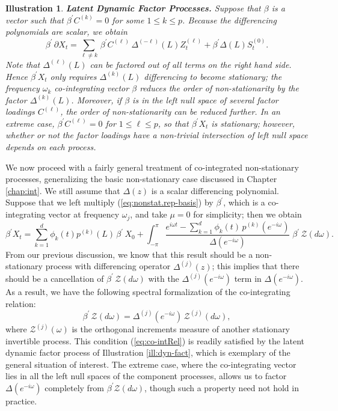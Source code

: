 \documentclass[a4paper]{book}
\newtheorem{Illustration}{Illustration}
\begin{document}
\begin{Illustration} {\bf Latent Dynamic Factor Processes.}
 Suppose that $\beta$ is a vector such that $\beta^{\prime}
 C^{(k)} = 0$ for some $1 \leq k \leq p$.  Because the differencing polynomials
 are scalar, we obtain
\[
 \beta^{\prime} \, \partial X_t = \sum_{\ell \neq k} \,
 \beta^{\prime} C^{(\ell)} \, \Delta^{(-\ell)} (L)
 Z^{(\ell)}_t + \beta^{\prime} \Delta (L) S^{(0)}_t.
\]
 Note that $\Delta^{(\ell)} (L)$ can be factored
 out of all terms on the right hand side.  Hence $\beta^{\prime}
 X_t$ only requires $\Delta^{(k)} (L)$ differencing to become
 stationary; the frequency $\omega_k$ co-integrating vector $\beta$
 reduces the order of non-stationarity by the factor
 $\Delta^{(k)} (L)$.  Moreover, if $\beta$ is in the left null space of
 several factor loadings $C^{(\ell)}$, the order of
 non-stationarity can be reduced further.  In an extreme case,
 $\beta^{\prime} C^{(\ell)} = 0$ for $1 \leq \ell \leq p$, so
 that $\beta^{\prime} X_t$ is stationary; however, whether or not
 the factor loadings have a non-trivial intersection of left null
 space depends on each process.
\end{Illustration}

 We now proceed with a fairly general treatment of co-integrated  non-stationary
 processes, generalizing the basic non-stationary case discussed
  in  Chapter \ref{chap:int}.  We still assume that $\Delta (z)$ is a scalar
  differencing polynomial.   Suppose that we left multiply 
 (\ref{eq:nonstat.rep-basis})  by $\beta^{\prime}$,
 which is a co-integrating vector at frequency $\omega_{j}$,
  and take $\mu = 0$ for simplicity; then we obtain
\begin{equation}
 \label{eq:co-intRep}
  \beta^{\prime} X_t = \sum_{k=1}^d \phi_k (t) p^{(k)} (L) \, \beta^{\prime} \, X_{0} 
   + \int_{-\pi}^{\pi}
 \frac{ e^{i \omega t} - \sum_{k=1}^d \phi_k (t) \, p^{(k)} 
  ( e^{-i \omega } )}{ \Delta (e^{-i \omega}) } \; \beta^{\prime} \,  \mathcal{Z} 
 (d\omega).
\end{equation}
   From our previous discussion, we know that this result should be a non-stationary
 process with differencing operator $\Delta^{(j)} (z)$; this implies
 that there should be a cancellation of 
 $\beta^{\prime} \, \mathcal{Z}  (d\omega)$ with the
 $\Delta^{(j)} (e^{-i \omega})$   term in
 $\Delta (e^{-i \omega})$.  As a result, we
 have the following spectral formalization of the co-integrating
 relation:
\begin{equation}
\label{eq:co-intRel}
 \beta^{\prime} \, \mathcal{Z}  (d\omega) = 
  \Delta^{(j)} (e^{-i \omega}) \, \mathcal{Z}^{(j)} (d\omega),
\end{equation}
 where $ \mathcal{Z}^{(j)} (\omega)$ is the orthogonal increments measure
 of another stationary invertible process.  This condition
 (\ref{eq:co-intRel}) is readily satisfied by the latent dynamic
 factor process of Illustration \ref{ill:dyn-fact},
  which is exemplary of the general
 situation of interest.  The extreme case, where the co-integrating
 vector lies in all the left null spaces of the component processes,
 allows us to factor $\Delta (e^{-i \omega})$ completely from
 $\beta^{\prime}  \mathcal{Z}  (d\omega)$, though such a property need not
 hold in practice.
\end{document}
